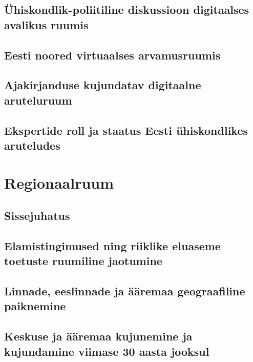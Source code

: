 \documentclass[]{book}
\begin{document}
\hypertarget{chapter1_3}{%
\section{Ühiskondlik-poliitiline diskussioon digitaalses avalikus ruumis}\label{chapter1_3}}

\hypertarget{chapter_1.4}{%
\section{Eesti noored virtuaalses arvamusruumis}\label{chapter_1.4}}

\hypertarget{chapter_1.5}{%
\section{Ajakirjanduse kujundatav digitaalne aruteluruum}\label{chapter_1.5}}

\hypertarget{chapter_1.6}{%
\section{Ekspertide roll ja staatus Eesti ühiskondlikes aruteludes}\label{chapter_1.6}}

\hypertarget{chapter2}{%
\chapter{Regionaalruum}\label{chapter2}}

\hypertarget{sissejuhatus-2}{%
\section*{Sissejuhatus}\label{sissejuhatus-2}}

\hypertarget{regionaal_2.2}{%
\section{Elamistingimused ning riiklike eluaseme toetuste ruumiline jaotumine}\label{regionaal_2.2}}

\hypertarget{regionaal_2.3}{%
\section{Linnade, eeslinnade ja ääremaa geograafiline paiknemine}\label{regionaal_2.3}}

\hypertarget{regionaal_2.4}{%
\section{Keskuse ja ääremaa kujunemine ja kujundamine viimase 30 aasta jooksul}\label{regionaal_2.4}}
\end{document}

